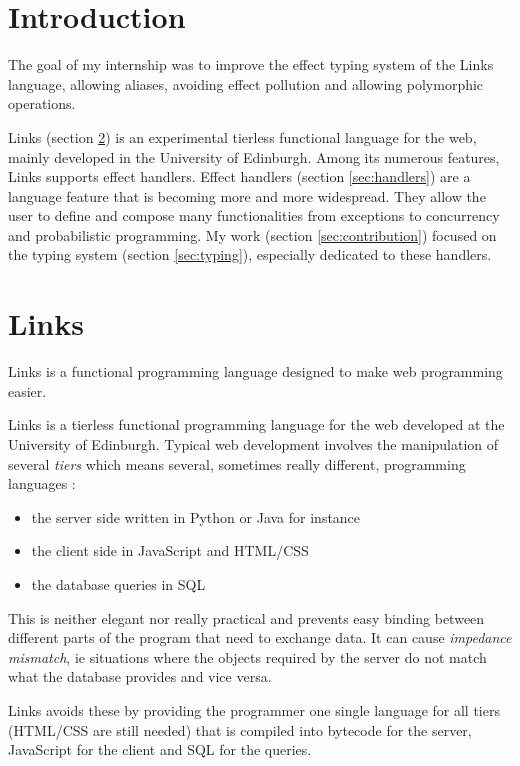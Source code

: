 \documentclass[11pt, nonacm=true, language=french, language=english]{acmart}
\begin{document}
\section{Introduction}

The goal of my internship was to improve the effect typing system of the Links language, allowing aliases, avoiding effect pollution and allowing polymorphic operations.

Links (section \ref{sec:links}) is an experimental tierless functional language for the web, mainly developed in the University of Edinburgh. Among its numerous features, Links supports effect handlers. Effect handlers (section \ref{sec:handlers}) are a language feature that is becoming more and more widespread. They allow the user to define and compose many functionalities from exceptions to concurrency and probabilistic programming. My work (section \ref{sec:contribution}) focused on the typing system (section \ref{sec:typing}), especially dedicated to these handlers.


\section{Links}
\label{sec:links}

\begin{fquote}
 Links is a functional programming language designed to make web programming easier.
\end{fquote}

Links \citep{links} is a tierless functional programming language for the web developed at the University of Edinburgh. Typical web development involves the manipulation of several \emph{tiers} which means several, sometimes really different, programming languages :
\begin{itemize}
  \item the server side written in Python or Java for instance
  \item the client side in JavaScript and HTML/CSS
  \item the database queries in SQL
\end{itemize}
This is neither elegant nor really practical and prevents easy binding between different parts of the program that need to exchange data. It can cause \emph{impedance mismatch}, ie situations where the objects required by the server do not match what the database provides and vice versa.

Links avoids these by providing the programmer one single language for all tiers (HTML/CSS are still needed) that is compiled into bytecode for the server, JavaScript for the client and SQL for the queries.
\end{document}
